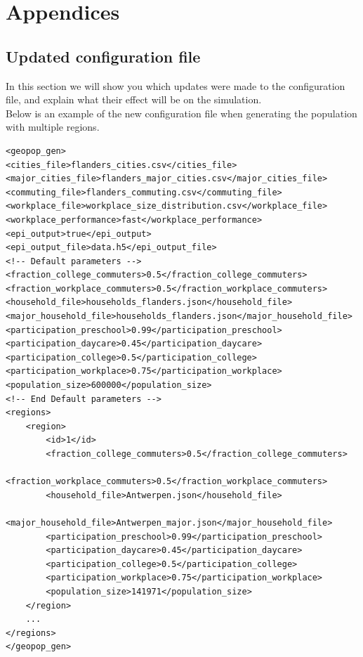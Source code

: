 \chapter{Appendices}
\label{chap:appendices}

\section{Updated configuration file}
\label{section:updated_config_file}

In this section we will show you which updates were made to the configuration file, and explain what their effect will be on the simulation.\\
Below is an example of the new configuration file when generating the population with multiple regions.

\begin{lstlisting}[caption={$<$geopop\_gen$>$ configuration},captionpos=b]
<geopop_gen>
<cities_file>flanders_cities.csv</cities_file>
<major_cities_file>flanders_major_cities.csv</major_cities_file>
<commuting_file>flanders_commuting.csv</commuting_file>
<workplace_file>workplace_size_distribution.csv</workplace_file>
<workplace_performance>fast</workplace_performance>
<epi_output>true</epi_output>
<epi_output_file>data.h5</epi_output_file>
<!-- Default parameters -->
<fraction_college_commuters>0.5</fraction_college_commuters>
<fraction_workplace_commuters>0.5</fraction_workplace_commuters>
<household_file>households_flanders.json</household_file>
<major_household_file>households_flanders.json</major_household_file>
<participation_preschool>0.99</participation_preschool>
<participation_daycare>0.45</participation_daycare>
<participation_college>0.5</participation_college>
<participation_workplace>0.75</participation_workplace>
<population_size>600000</population_size>
<!-- End Default parameters -->
<regions>
	<region>
		<id>1</id>
		<fraction_college_commuters>0.5</fraction_college_commuters>
		<fraction_workplace_commuters>0.5</fraction_workplace_commuters>
		<household_file>Antwerpen.json</household_file>
		<major_household_file>Antwerpen_major.json</major_household_file>
		<participation_preschool>0.99</participation_preschool>
		<participation_daycare>0.45</participation_daycare>
		<participation_college>0.5</participation_college>
		<participation_workplace>0.75</participation_workplace>
		<population_size>141971</population_size>
	</region>
	...
</regions>
</geopop_gen>
\end{lstlisting}

